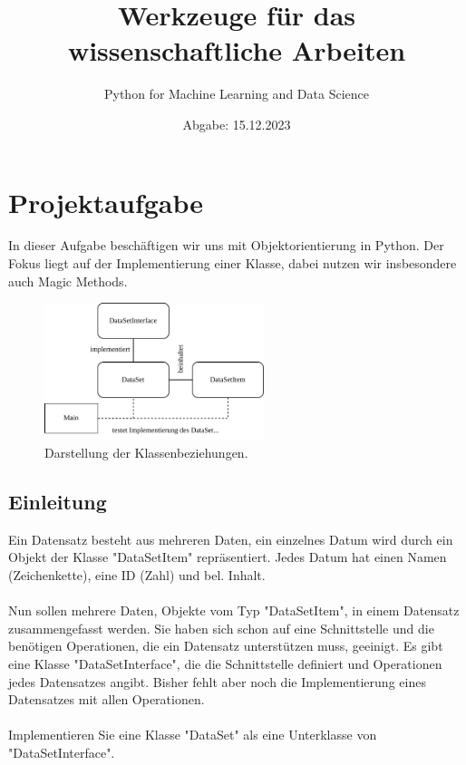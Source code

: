 \documentclass[oneside, 11pt, a4paper, parskip=full]{scrartcl}
\title{Werkzeuge für das wissenschaftliche Arbeiten}
\subtitle{Python for Machine Learning and Data Science}
\author{}
\date{\vspace{-1cm}Abgabe: 15.12.2023}
\begin{document}
\maketitle

\tableofcontents

\section{Projektaufgabe}

In dieser Aufgabe beschäftigen wir uns mit Objektorientierung in Python.
Der Fokus liegt auf der Implementierung einer Klasse, dabei nutzen wir insbesondere auch Magic Methods.

\begin{figure}
    \centering
    \includegraphics[height=4cm]{./../diagram/classes_files.pdf}
    \caption{Darstellung der Klassenbeziehungen.}
\end{figure}

\subsection{Einleitung}

Ein Datensatz besteht aus mehreren Daten, ein einzelnes Datum wird durch ein Objekt der Klasse "DataSetItem" repräsentiert.
Jedes Datum hat einen Namen (Zeichenkette), eine ID (Zahl) und bel. Inhalt.\\
\\
Nun sollen mehrere Daten, Objekte vom Typ "DataSetItem", in einem Datensatz zusammengefasst werden.
Sie haben sich schon auf eine Schnittstelle und die benötigen Operationen, die ein Datensatz unterstützen muss, geeinigt.
Es gibt eine Klasse "DataSetInterface", die die Schnittstelle definiert und Operationen jedes Datensatzes angibt.
Bisher fehlt aber noch die Implementierung eines Datensatzes mit allen Operationen.\\
\\
Implementieren Sie eine Klasse "DataSet" als eine Unterklasse von "DataSetInterface".
\end{document}
